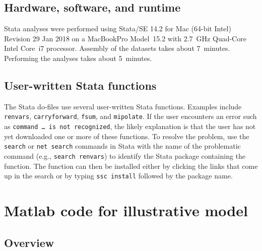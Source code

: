 \documentclass[a4,12p]{article}
\begin{document}
\subsection{Hardware, software, and runtime}

Stata analyses were performed using Stata/SE 14.2 for Mac (64-bit Intel)
Revision 29 Jan 2018 on a MacBookPro Model~15.2 with 2.7~GHz Quad-Core Intel Core~i7 processor. Assembly of the datasets takes about 7~minutes.  Performing the analyses takes about 5~minutes.

\subsection{User-written Stata functions}

The Stata do-files use several user-written Stata functions. Examples include {\tt renvars}, {\tt carryforward}, {\tt fsum}, and {\tt mipolate}. If the user encounters an error such as {\tt command … is not recognized}, the likely explanation is that the user has not yet downloaded one or more of these functions. To resolve the problem, use the {\tt search} or {\tt net search} commands in Stata with the name of the problematic command (e.g., {\tt search renvars}) to identify the Stata package containing the function. The function can then be installed either by clicking the links that come up in the search or by typing {\tt ssc install} followed by the package name.
	
\section{Matlab code for illustrative model} 

\subsection{Overview}
\label{sec:illustrative-overview-over-code}
\end{document}
